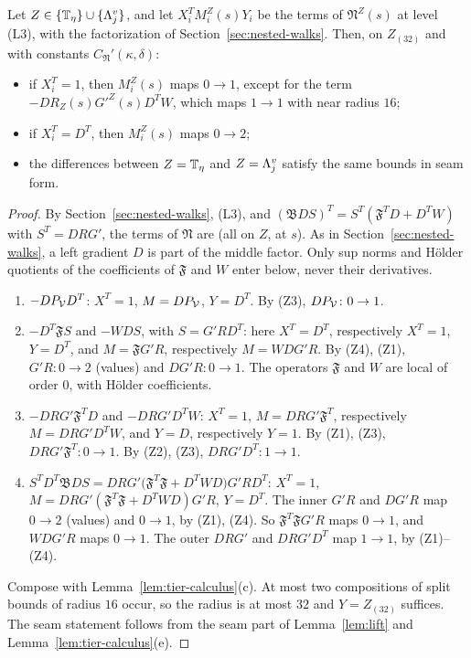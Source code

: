 \begin{lemma}\label{lem:N-tier}
Let $Z\in\{\mathbb T_\eta\}\cup\{\Lambda^v_j\}$, and let $X_i^TM_i^Z(s)Y_i$ be the terms of $\mathfrak N^Z(s)$ at level (L3), with the factorization of Section~\ref{sec:nested-walks}. Then, on $Z_{(32)}$ and with constants $C_{\mathfrak N}'(\kappa,\delta)$:
\begin{itemize}
\item if $X_i^T=1$, then $M_i^Z(s)$ maps $0\to1$, except for the term $-DR_Z(s)G'^Z(s)D^TW$, which maps $1\to1$ with near radius $16$;
\item if $X_i^T=D^T$, then $M_i^Z(s)$ maps $0\to2$;
\item the differences between $Z=\mathbb T_\eta$ and $Z=\Lambda^v_j$ satisfy the same bounds in seam form.
\end{itemize}
\end{lemma}

\begin{proof}
By Section~\ref{sec:nested-walks}, (L3), and $(\mathfrak B D S)^T=S^T(\mathfrak F^TD+D^TW)$ with $S^T=DRG'$, the terms of $\mathfrak N$ are (all on $Z$, at $s$). As in Section~\ref{sec:nested-walks}, a left gradient $D$ is part of the middle factor. Only sup norms and H\"older quotients of the coefficients of $\mathfrak F$ and $W$ enter below, never their derivatives.
\begin{enumerate}[label=(\roman*)]
\item $-DP_\mathcal V D^T$: $X^T=1$, $M=DP_\mathcal V$, $Y=D^T$. By (Z3), $DP_\mathcal V\colon0\to1$.
\item $-D^T\mathfrak FS$ and $-WDS$, with $S=G'RD^T$: here $X^T=D^T$, respectively $X^T=1$, $Y=D^T$, and $M=\mathfrak FG'R$, respectively $M=WDG'R$. By (Z4), (Z1), $G'R\colon0\to2$ (values) and $DG'R\colon0\to1$. The operators $\mathfrak F$ and $W$ are local of order $0$, with H\"older coefficients.
\item $-DRG'\mathfrak F^TD$ and $-DRG'D^TW$: $X^T=1$, $M=DRG'\mathfrak F^T$, respectively $M=DRG'D^TW$, and $Y=D$, respectively $Y=1$. By (Z1), (Z3), $DRG'\mathfrak F^T\colon0\to1$. By (Z2), (Z3), $DRG'D^T\colon1\to1$.
\item $S^TD^T\mathfrak BDS=DRG'\big(\mathfrak F^T\mathfrak F+D^TWD\big)G'RD^T$: $X^T=1$, $M=DRG'(\mathfrak F^T\mathfrak F+D^TWD)G'R$, $Y=D^T$. The inner $G'R$ and $DG'R$ map $0\to2$ (values) and $0\to1$, by (Z1), (Z4). So $\mathfrak F^T\mathfrak FG'R$ maps $0\to1$, and $WDG'R$ maps $0\to1$. The outer $DRG'$ and $DRG'D^T$ map $1\to1$, by (Z1)--(Z4).
\end{enumerate}
Compose with Lemma~\ref{lem:tier-calculus}(c). At most two compositions of split bounds of radius $16$ occur, so the radius is at most $32$ and $Y=Z_{(32)}$ suffices. The seam statement follows from the seam part of Lemma~\ref{lem:lift} and Lemma~\ref{lem:tier-calculus}(e).
\end{proof}

